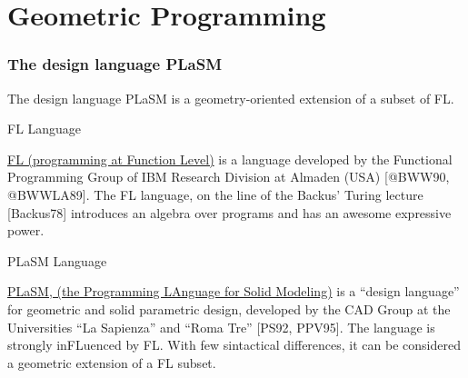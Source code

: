 \documentclass[ignorenonframetext,]{beamer}
\def\emph#1{{\color{cyan}#1}}
\begin{document}
\section{Geometric Programming}

\begin{frame}\frametitle{The design language PLaSM}

The design language PLaSM is a geometry-oriented extension of a subset
of FL.

\small

\begin{block}{FL Language}

\href{http://en.wikipedia.org/wiki/FL_programming_language}{\emph{FL
(programming at Function Level)}} is a language developed by the
Functional Programming Group of IBM Research Division at Almaden (USA)
{[}@BWW90, @BWWLA89{]}. The FL language, on the line of the Backus'
Turing lecture {[}Backus78{]} introduces an algebra over programs and
has an awesome expressive power.

\end{block}

\begin{block}{PLaSM Language}

\href{http://plasm.net/}{\emph{PLaSM, (the Programming LAnguage for
Solid Modeling)}} is a ``design language'' for geometric and solid
parametric design, developed by the CAD Group at the Universities ``La
Sapienza'' and ``Roma Tre'' {[}PS92, PPV95{]}. The language is strongly
inFLuenced by FL. With few sintactical differences, it can be considered
a geometric extension of a FL subset.

\end{block}

\end{frame}
\end{document}
